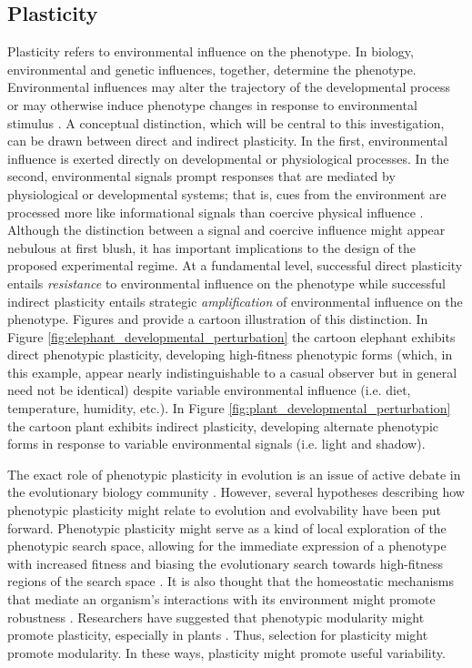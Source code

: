 \subsection{Plasticity}

Plasticity refers to environmental influence on the phenotype. In biology, environmental and genetic influences, together, determine the phenotype. Environmental influences may alter the trajectory of the developmental process or may otherwise induce phenotype changes in response to environmental stimulus \cite{Fusco2010PhenotypicConcepts}. A conceptual distinction, which will be central to this investigation, can be drawn between direct and indirect plasticity. In the first, environmental influence is exerted directly on developmental or physiological processes. In the second, environmental signals prompt responses that are mediated by physiological or developmental systems; that is, cues from the environment are processed more like informational signals than coercive physical influence \cite{Fusco2010PhenotypicConcepts}. Although the distinction between a signal and coercive influence might appear nebulous at first blush, it has important implications to the design of the proposed experimental regime. At a fundamental level, successful direct plasticity entails \textit{resistance} to environmental influence on the phenotype while successful indirect plasticity entails strategic \textit{amplification} of environmental influence on the phenotype. Figures  and  provide a cartoon illustration of this distinction. In Figure \ref{fig:elephant_developmental_perturbation} the cartoon elephant exhibits direct phenotypic plasticity, developing high-fitness phenotypic forms (which, in this example, appear nearly indistinguishable to a casual observer but in general need not be identical) despite variable environmental influence (i.e. diet, temperature, humidity, etc.). In Figure \ref{fig:plant_developmental_perturbation} the cartoon plant exhibits indirect plasticity, developing alternate phenotypic forms in response to variable environmental signals (i.e. light and shadow).

The exact role of phenotypic plasticity in evolution is an issue of active debate in the evolutionary biology community \cite{Pigliucci2008IsEvolvable}. However, several hypotheses describing how phenotypic plasticity might relate to evolution and evolvability have been put forward. Phenotypic plasticity might serve as a kind of local exploration of the phenotypic search space, allowing for the immediate expression of a phenotype with increased fitness and biasing the evolutionary search towards high-fitness regions of the search space \cite{Downing2012HeterochronousBaldwinism}. It is also thought that the homeostatic mechanisms that mediate an organism's interactions with its environment might promote robustness \cite{Moczek2011TheInnovation}. Researchers have suggested that phenotypic modularity might promote plasticity, especially in plants \cite{Schlichting1986ThePlants, DeKroon2005APlants}. Thus, selection for plasticity might promote modularity. In these ways, plasticity might promote useful variability.

